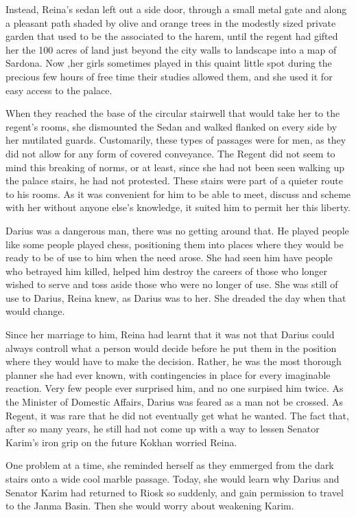 \documentclass{article}
\begin{document}
	Instead, Reina’s sedan left out a side door, through a small metal gate and along a pleasant path shaded by olive and orange trees in the modestly sized private garden that used to be the associated to the harem, until the regent had gifted her the 100 acres of land just beyond the city walls to landscape into a map of Sardona. Now ,her girls sometimes played in this quaint little spot during the precious few hours of free time their studies allowed them, and she used it for easy access to the palace. 
	
	When they reached the base of the circular stairwell that would take her to the regent’s rooms, she dismounted the Sedan and walked flanked on every side by her mutilated guards. Customarily, these types of passages were for men, as they did not allow for any form of covered conveyance. The Regent did not seem to mind this breaking of norms, or at least, since she had not been seen walking up the palace stairs, he had not protested. These stairs were part of a quieter route to his rooms. As it was convenient for him to be able to meet, discuss and scheme with her without anyone else’s knowledge, it suited him to permit her this liberty. 
	
	Darius was a dangerous man, there was no getting around that. He played people like some people played chess, positioning them into places where they would be ready to be of use to him when the need arose. She had seen him have people who betrayed him killed, helped him destroy the careers of those who longer wished to serve and toss aside those who were no longer of use. She was still of use to Darius, Reina knew, as Darius was to her. She dreaded the day when that would change.
	
	Since her marriage to him, Reina had learnt that it was not that Darius could always controll what a person would decide before he put them in the position where they would have to make the decision. Rather, he was the most thorough planner she had ever known, with contingencies in place for every imaginable reaction. Very few people  ever surprised him, and no one surpised him twice. As the Minister of Domestic Affairs, Darius was  feared as a man not be crossed. As Regent, it was rare that he did not eventually get what he wanted. The fact that, after so many years, he still had not come up with a way to lessen Senator Karim’s iron grip on the future Kokhan worried Reina.
	
	One problem at a time, she reminded herself as they emmerged from the dark stairs onto a wide cool marble passage. Today, she would learn why Darius and Senator Karim had returned to Riosk so suddenly, and gain permission to travel to the Janma Basin. Then she would worry about weakening Karim.
	
\end{document}

